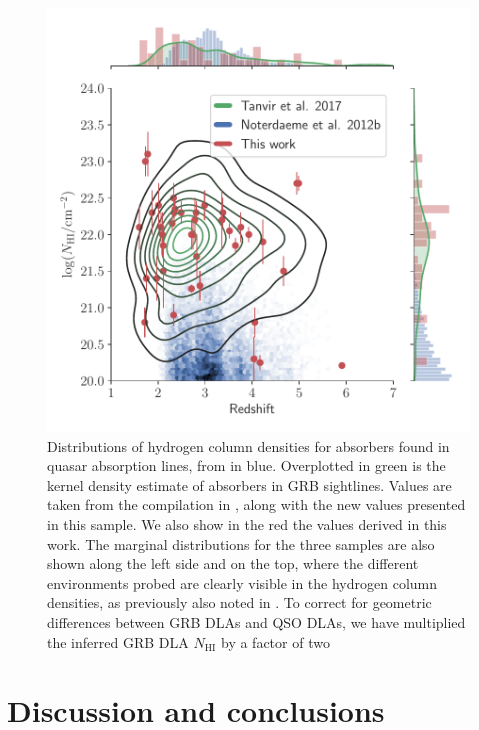 \documentclass[longauth]{aa}    %
\begin{document}
\begin{figure}[!t]
	\centering \includegraphics[width=\columnwidth]{figures/NH_dist.pdf}
\caption{Distributions of hydrogen column densities for absorbers found in
	quasar absorption lines, from \citet{Noterdaeme2012b} in blue. Overplotted in
	green is the kernel density estimate of absorbers in GRB sightlines. Values are
	taken from the compilation in \citet{Tanvir2017}, along with the new
	values presented in this sample. We also show in the red the values derived in
	this work. The marginal distributions for the three samples are also shown
	along the left side and on the top, where the different environments probed are
	clearly visible in the hydrogen column densities, as previously also noted in
	\citet{Fynbo2009}. To correct for geometric differences between GRB DLAs and QSO DLAs, we have multiplied the inferred GRB DLA $N_{\mathrm{HI}}$ by a factor of two} \label{fig:NH_dist}
\end{figure}



\section{Discussion and conclusions}\label{conclusions}
\end{document}
